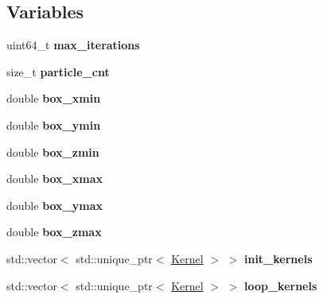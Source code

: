 \subsection*{Variables}
\begin{DoxyCompactItemize}
\item 
\mbox{\label{namespacewash_a7c97ecfdda83ead3747575f282914fc7}} 
uint64\+\_\+t {\bfseries max\+\_\+iterations}
\item 
\mbox{\label{namespacewash_ad6aebf5344b1fc0abbba9caafc9e4148}} 
size\+\_\+t {\bfseries particle\+\_\+cnt}
\item 
\mbox{\label{namespacewash_a5594c5b6d88e52502a105679e9dce1e5}} 
double {\bfseries box\+\_\+xmin}
\item 
\mbox{\label{namespacewash_a2bb279bd282b3bb57afec4eaaa7881f0}} 
double {\bfseries box\+\_\+ymin}
\item 
\mbox{\label{namespacewash_aa81fea0809af4d84ee5cc0cde58ef23a}} 
double {\bfseries box\+\_\+zmin}
\item 
\mbox{\label{namespacewash_ad5a717b6958f5b958fdc4095a379bbc1}} 
double {\bfseries box\+\_\+xmax}
\item 
\mbox{\label{namespacewash_a29748bd44623020b9ccbd84f4f0873cd}} 
double {\bfseries box\+\_\+ymax}
\item 
\mbox{\label{namespacewash_a4e905cfd39ee71265bcf49732b1c8738}} 
double {\bfseries box\+\_\+zmax}
\item 
\mbox{\label{namespacewash_ae78f9afe5afb195bb7756b8d5214079d}} 
std\+::vector$<$ std\+::unique\+\_\+ptr$<$ \mbox{\hyperlink{classwash_1_1Kernel}{Kernel}} $>$ $>$ {\bfseries init\+\_\+kernels}
\item 
\mbox{\label{namespacewash_a5de57cfe1510fe6ee588720a6776fc13}} 
std\+::vector$<$ std\+::unique\+\_\+ptr$<$ \mbox{\hyperlink{classwash_1_1Kernel}{Kernel}} $>$ $>$ {\bfseries loop\+\_\+kernels}
\item 
\mbox{\label{namespacewash_a203a4143c9b4f10b183aaaa4ad06bbc3}} 

\end{DoxyCompactItemize}
